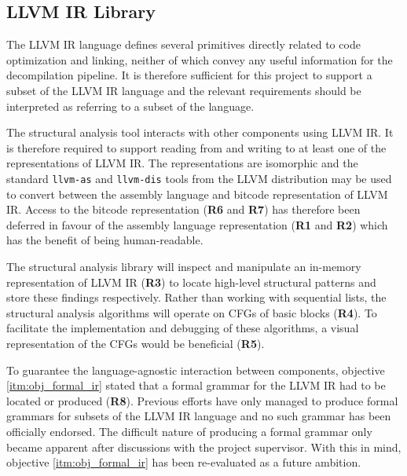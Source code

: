 
\subsection{LLVM IR Library}

The LLVM IR language defines several primitives directly related to code optimization and linking, neither of which convey any useful information for the decompilation pipeline. It is therefore sufficient for this project to support a subset of the LLVM IR language and the relevant requirements should be interpreted as referring to a subset of the language.

The structural analysis tool interacts with other components using LLVM IR. It is therefore required to support reading from and writing to at least one of the representations of LLVM IR. The representations are isomorphic and the standard \texttt{llvm-as} and \texttt{llvm-dis} tools from the LLVM distribution may be used to convert between the assembly language and bitcode representation of LLVM IR. Access to the bitcode representation (\textbf{R6} and \textbf{R7}) has therefore been deferred in favour of the assembly language representation (\textbf{R1} and \textbf{R2}) which has the benefit of being human-readable.

The structural analysis library will inspect and manipulate an in-memory representation of LLVM IR (\textbf{R3}) to locate high-level structural patterns and store these findings respectively. Rather than working with sequential lists, the structural analysis algorithms will operate on CFGs of basic blocks (\textbf{R4}). To facilitate the implementation and debugging of these algorithms, a visual representation of the CFGs would be beneficial (\textbf{R5}).

To guarantee the language-agnostic interaction between components, objective \ref{itm:obj_formal_ir} stated that a formal grammar for the LLVM IR had to be located or produced (\textbf{R8}). Previous efforts have only managed to produce formal grammars for subsets of the LLVM IR language \cite{formal_llvm_ir_spec,formalizing_llvm_ir} and no such grammar has been officially endorsed. The difficult nature of producing a formal grammar only became apparent after discussions with the project supervisor. With this in mind, objective \ref{itm:obj_formal_ir} has been re-evaluated as a future ambition.

